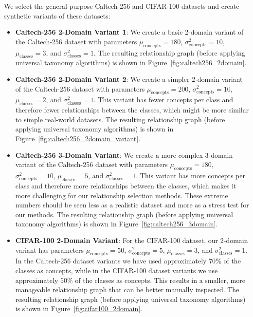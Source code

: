 We select the general-purpose Caltech-256 and CIFAR-100 datasets
and create synthetic variants of these datasets:
\begin{itemize}
      \item \textbf{Caltech-256 2-Domain Variant 1}:
            We create a basic 2-domain variant of the Caltech-256 dataset
            with parameters $\mu_{\text{concepts}}=180$, $\sigma^2_{\text{concepts}}=10$,
            $\mu_{\text{classes}}=3$, and $\sigma^2_{\text{classes}}=1$.
            The resulting relationship graph (before applying universal taxonomy algorithms)
            is shown in Figure~\ref{fig:caltech256_2domain}.
      \item \textbf{Caltech-256 2-Domain Variant 2}:
            We create a simpler 2-domain variant of the Caltech-256 dataset
            with parameters $\mu_{\text{concepts}}=200$, $\sigma^2_{\text{concepts}}=10$,
            $\mu_{\text{classes}}=2$, and $\sigma^2_{\text{classes}}=1$.
            This variant has fewer concepts per class and therefore fewer relationships
            between the classes, which might be more similar to simple real-world datasets.
            The resulting relationship graph (before applying universal taxonomy algorithms)
            is shown in Figure~\ref{fig:caltech256_2domain_variant}.
      \item \textbf{Caltech-256 3-Domain Variant}:
            We create a more complex 3-domain variant of the Caltech-256 dataset
            with parameters $\mu_{\text{concepts}}=180$, $\sigma^2_{\text{concepts}}=10$,
            $\mu_{\text{classes}}=5$, and $\sigma^2_{\text{classes}}=1$.
            This variant has more concepts per class and therefore more relationships
            between the classes, which makes it more challenging for our relationship selection methods.
            These extreme numbers should be seen less as a realistic dataset
            and more as a stress test for our methods.
            The resulting relationship graph (before applying universal taxonomy algorithms)
            is shown in Figure~\ref{fig:caltech256_3domain}.
      \item \textbf{CIFAR-100 2-Domain Variant}:
            For the CIFAR-100 dataset,
            our 2-domain variant has parameters $\mu_{\text{concepts}}=50$, $\sigma^2_{\text{concepts}}=5$,
            $\mu_{\text{classes}}=3$, and $\sigma^2_{\text{classes}}=1$.
            In the Caltech-256 dataset variants we have used approximately $70\%$ of the classes as concepts,
            while in the CIFAR-100 dataset variants we use approximately $50\%$ of the classes as concepts.
            This results in a smaller, more manageable relationship graph
            that can be better manually inspected.
            The resulting relationship graph (before applying universal taxonomy algorithms)
            is shown in Figure~\ref{fig:cifar100_2domain}.
\end{itemize}

